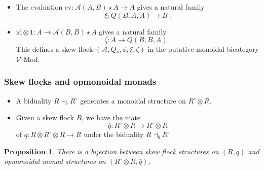\documentclass{beamer}
\newcommand{\lra}{\longrightarrow}
\def\CA{{\mathscr A}}
\def\CV{{\mathscr V}}
\newtheorem{proposition}[theorem]{Proposition}
\begin{document}
\begin{frame}
 \begin{itemize}
\item The evaluation $\mathrm{ev} : \CA (A,B)\star A \lra A$ gives a natural family 
$$\xi : Q(B,A,A) \lra B \ .$$
\pause
\item $\mathrm{id}\otimes 1 : A \lra \CA (B,B)\star A$ gives a natural family
$$\zeta : A \lra Q(B,B,A) \ .$$
This defines a skew flock $(\CA,Q_*, \phi, \xi, \zeta)$ in the putative monoidal bicategory $\CV\text{-}\mathrm{Mod}$.
 \end{itemize}
\end{frame}
\begin{frame}
 \frametitle{Skew flocks and opmonoidal monads}
 \begin{itemize}
 \item A biduality $R\dashv _{b}R^{\circ }$ generates a monoidal structure on $R^{\circ }\otimes R$. 
 \pause
 \item Given a skew flock $R$, we have the mate
\begin{equation*}
\hat{q}:R^{\circ }\otimes R\longrightarrow R^{\circ }\otimes R
\end{equation*}
of $q:R\otimes R^{\circ }\otimes R\longrightarrow R$ under the biduality $R\dashv _{b}R^{\circ }$.
\end{itemize}
\pause
\begin{proposition}\label{opmnd=skflk} 
There is a bijection between skew flock structures on $(R,q)$ 
and opmonoidal monad structures on $(R^{\circ }\otimes R, \hat{q})$.  
\end{proposition}
\end{frame}
\end{document}
